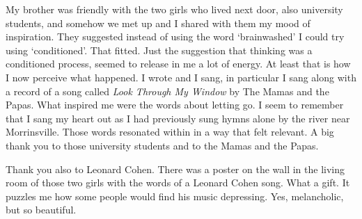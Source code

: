 My brother was friendly with the two girls who lived next door, also
university students, and somehow we met up and I shared with them my
mood of inspiration. They suggested instead of using the word
`brainwashed' I could try using `conditioned'. That fitted. Just the
suggestion that thinking was a conditioned process, seemed to release in
me a lot of energy. At least that is how I now perceive what happened. I
wrote and I sang, in particular I sang along with a record of a song
called \emph{Look Through My Window}\cite{window} by The Mamas and the Papas. What
inspired me were the words
about letting go. I seem to remember that I sang my heart out
as I had previously sung hymns alone by the river near Morrinsville. Those words
resonated within in a way that felt relevant. A big thank you
to those university students and to the Mamas and the Papas.

Thank you also to Leonard Cohen. There was a poster on the wall in the
living room of those two girls with the words of a Leonard Cohen song.
What a gift. It puzzles me how some people would find his music
depressing. Yes, melancholic, but so beautiful.
